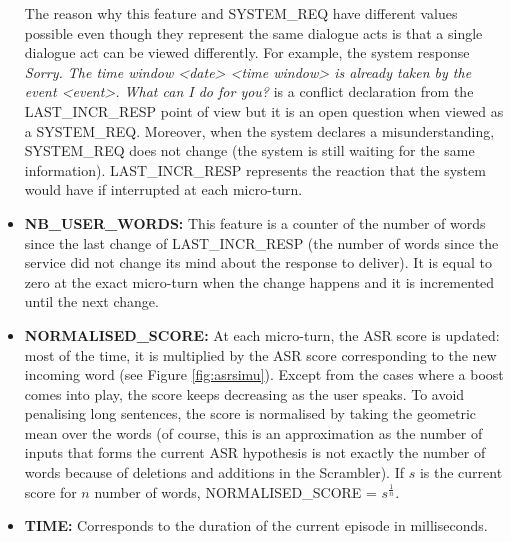 \begin{itemize}
							The reason why this feature and SYSTEM\_REQ have different values possible even though they represent the same dialogue acts is that a single dialogue act can be viewed differently. For example, the system response \textit{Sorry. The time window <date> <time window> is already taken by the event <event>. What can I do for you?} is a conflict declaration from the LAST\_INCR\_RESP point of view but it is an open question when viewed as a SYSTEM\_REQ. Moreover, when the system declares a misunderstanding, SYSTEM\_REQ does not change (the system is still waiting for the same information). LAST\_INCR\_RESP represents the reaction that the system would have if interrupted at each micro-turn.
						
            \item \textbf{NB\_USER\_WORDS:} This feature is a counter of the number of words since the last change of LAST\_INCR\_RESP (the number of words since the service did not change its mind about the response to deliver). It is equal to zero at the exact micro-turn when the change happens and it is incremented until the next change.
						
            \item \textbf{NORMALISED\_SCORE:} At each micro-turn, the ASR score is updated: most of the time, it is multiplied by the ASR score corresponding to the new incoming word (see Figure \ref{fig:asrsimu}). Except from the cases where a boost comes into play, the score keeps decreasing as the user speaks. To avoid penalising long sentences, the score is normalised by taking the geometric mean over the words (of course, this is an approximation as the number of inputs that forms the current ASR hypothesis is not exactly the number of words because of deletions and additions in the Scrambler). If $s$ is the current score for $n$ number of words, NORMALISED\_SCORE = $s^{\frac{1}{n}}$.
            \item \textbf{TIME:} Corresponds to the duration of the current episode in milliseconds.
        \end{itemize}
				
